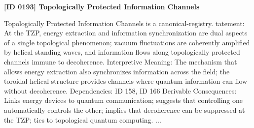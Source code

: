 \clearpage
\noindent\textbf{[ID 0193] Topologically Protected Information Channels}\par
\vspace{0.35em}
\begingroup\small
{}
Topologically Protected Information Channels is a canonical-registry. tatement: At the TZP, energy extraction and information synchronization are dual aspects of a single topological phenomenon; vacuum fluctuations are coherently amplified by helical standing waves, and information flows along topologically protected channels immune to decoherence.   Interpretive Meaning: The mechanism that allows energy extraction also synchronizes information across the field; the toroidal helical structure provides channels where quantum information can flow without decoherence.   Dependencies: ID 158, ID 166   Derivable Consequences: Links energy devices to quantum communication; suggests that controlling one automatically controls the other; implies that decoherence can be suppressed at the TZP; ties to topological quantum computing. ...

